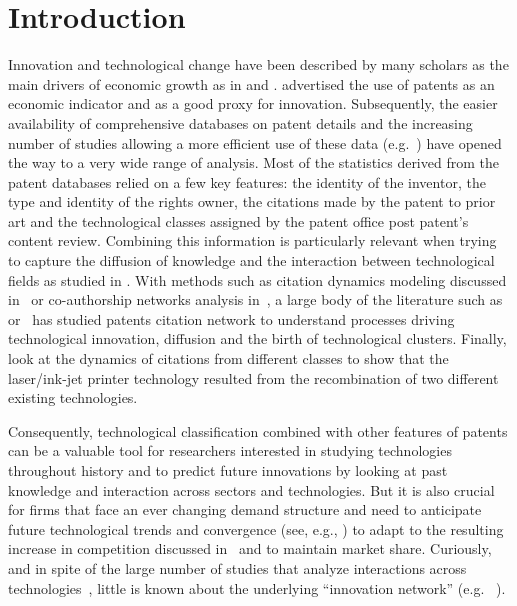 \documentclass[12pt,twoside,a4paper]{article}
\begin{document}
\section{Introduction}
Innovation and technological change have been described by many scholars as the main drivers of economic growth as in \cite{aghionhowitt1992} and \cite{romer1990}. \cite{RePEc:nbr:nberwo:3301} advertised the use of patents as an economic indicator and as a good proxy for innovation. Subsequently, the easier availability of comprehensive databases on patent details and the increasing number of studies allowing a more efficient use of these data (e.g.~\cite{Hall2001}) have opened the way to a very wide range of analysis. Most of the statistics derived from the patent databases relied on a few key features: the identity of the inventor, the type and identity of the rights owner, the citations made by the patent to prior art and the technological classes assigned by the patent office post patent's content review. Combining this information is particularly relevant when trying to capture the diffusion of knowledge and the interaction between technological fields as studied in \cite{Youn:2015fk}. With methods such as citation dynamics modeling discussed in~\cite{2013arXiv1310.8220N} or co-authorship networks analysis in~\cite{2014arXiv1402.7268S}, a large body of the literature such as~\cite{sorenson2006complexity} or~\cite{kay2014patent} has studied patents citation network to understand processes driving technological innovation, diffusion and the birth of technological clusters. Finally, \cite{bruck2016recognition} look at the dynamics of citations from different classes to show that the laser/ink-jet printer technology resulted from the recombination of two different existing technologies. 

Consequently, technological classification combined with other features of patents can be a valuable tool for researchers interested in studying technologies throughout history and to predict future innovations by looking at past knowledge and interaction across sectors and technologies. But it is also crucial for firms that face an ever changing demand structure and need to anticipate future technological trends and convergence (see, e.g., \cite{curran2011patent}) to adapt to the resulting increase in competition discussed in~\cite{Katz1996remarks} and to maintain market share. Curiously, and in spite of the large number of studies that analyze interactions across technologies~\cite{Furman2011shoulders}, little is known about the underlying ``innovation network'' (e.g. ~\cite{AAKnetwork2016}). 
\end{document}
